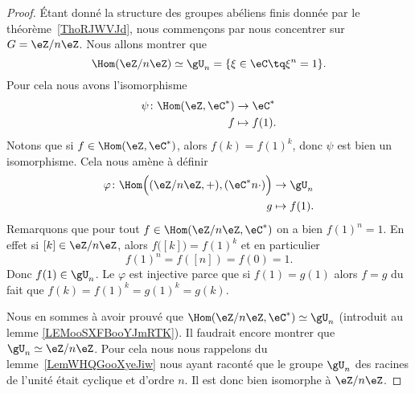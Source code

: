 \begin{proof}
    Étant donné la structure des groupes abéliens finis donnée par le théorème~\ref{ThoRJWVJd}, nous commençons par nous concentrer sur \( G=\eZ/n\eZ\). Nous allons montrer que
    \begin{equation}
        \Hom(\eZ/n\eZ)\simeq \gU_n=\{ \xi\in \eC\tq \xi^n=1 \}.
    \end{equation}
    Pour cela nous avons l'isomorphisme
    \begin{equation}
        \begin{aligned}
            \psi\colon \Hom(\eZ,\eC^*)&\to \eC^* \\
            f&\mapsto f(1).
        \end{aligned}
    \end{equation}
    Notons que si \( f\in \Hom(\eZ,\eC^*)\), alors \( f(k)=f(1)^k\), donc \( \psi\) est bien un isomorphisme. Cela nous amène à définir
    \begin{equation}
        \begin{aligned}
            \varphi\colon \Hom\Big( (\eZ/n\eZ,+),(\eC^*n\cdot) \Big)&\to \gU_n \\
            g&\mapsto f(1).
        \end{aligned}
    \end{equation}
    Remarquons que pour tout \( f\in\Hom(\eZ/n\eZ,\eC^*)\) on a bien \( f(1)^n=1\). En effet si \( [k]\in \eZ/n\eZ\), alors \( f\big( [k] \big)=f(1)^k\) et en particulier
    \begin{equation}
        f(1)^n=f([n])=f(0)=1.
    \end{equation}
    Donc \( f(1)\in \gU_n\). Le \( \varphi\) est injective parce que si \( f(1)=g(1)\) alors \( f=g\) du fait que \( f(k)=f(1)^k=g(1)^k=g(k)\).

    Nous en sommes à avoir prouvé que \( \Hom(\eZ/n\eZ,\eC^*)\simeq \gU_n\) (introduit au lemme \ref{LEMooSXFBooYJmRTK}). Il faudrait encore montrer que \( \gU_n\simeq \eZ/n\eZ\). Pour cela nous nous rappelons du lemme~\ref{LemWHQGooXyeJiw} nous ayant raconté que le groupe \( \gU_n\) des racines de l'unité était cyclique et d'ordre \( n\). Il est donc bien isomorphe à \( \eZ/n\eZ\).


\end{proof}
